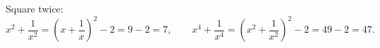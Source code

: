 Square twice:
\[
x^2+\dfrac{1}{x^2}=\left(x+\dfrac{1}{x}\right)^2-2=9-2=7,\qquad x^4+\dfrac{1}{x^4}=\left(x^2+\dfrac{1}{x^2}\right)^2-2=49-2=\boxed{47}.
\]
